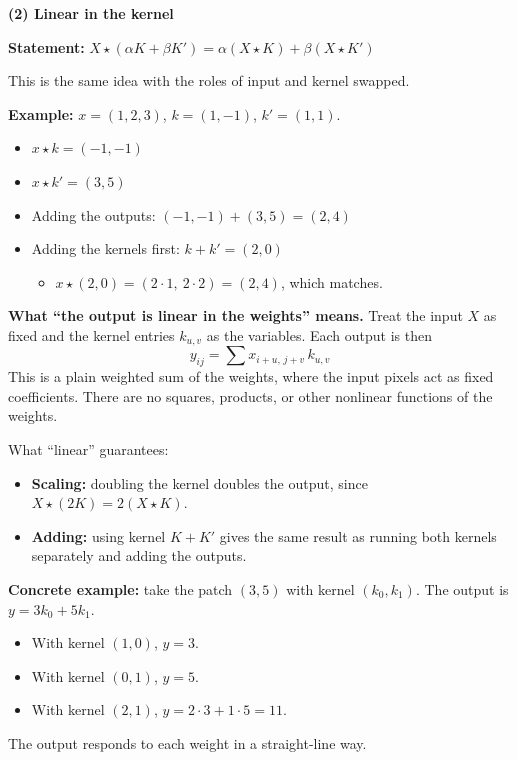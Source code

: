 \textbf{(2) Linear in the kernel}

\textbf{Statement:} $X \star (\alpha K + \beta K') = \alpha (X \star K) + \beta (X \star K')$

This is the same idea with the roles of input and kernel swapped.

\textbf{Example:} $x = (1, 2, 3)$, $k = (1, -1)$, $k' = (1, 1)$.
\begin{itemize}
  \item $x \star k = (-1, -1)$
  \item $x \star k' = (3, 5)$
  \item Adding the outputs: $(-1, -1) + (3, 5) = (2, 4)$
  \item Adding the kernels first: $k + k' = (2, 0)$
  \begin{itemize}
    \item $x \star (2, 0) = (2\cdot 1,\ 2\cdot 2) = (2, 4)$, which matches.
  \end{itemize}
\end{itemize}

\textbf{What ``the output is linear in the weights'' means.} Treat the input $X$ as fixed and the kernel entries $k_{u,v}$ as the variables. Each output is then
\[
y_{ij} = \sum x_{i+u,\, j+v}\, k_{u,v}
\]
This is a plain weighted sum of the weights, where the input pixels act as fixed coefficients. There are no squares, products, or other nonlinear functions of the weights.

What ``linear'' guarantees:
\begin{itemize}
  \item \textbf{Scaling:} doubling the kernel doubles the output, since $X \star (2K) = 2(X \star K)$.
  \item \textbf{Adding:} using kernel $K + K'$ gives the same result as running both kernels separately and adding the outputs.
\end{itemize}

\textbf{Concrete example:} take the patch $(3, 5)$ with kernel $(k_0, k_1)$. The output is $y = 3k_0 + 5k_1$.
\begin{itemize}
  \item With kernel $(1, 0)$, $y = 3$.
  \item With kernel $(0, 1)$, $y = 5$.
  \item With kernel $(2, 1)$, $y = 2\cdot 3 + 1\cdot 5 = 11$.
\end{itemize}
The output responds to each weight in a straight-line way.


